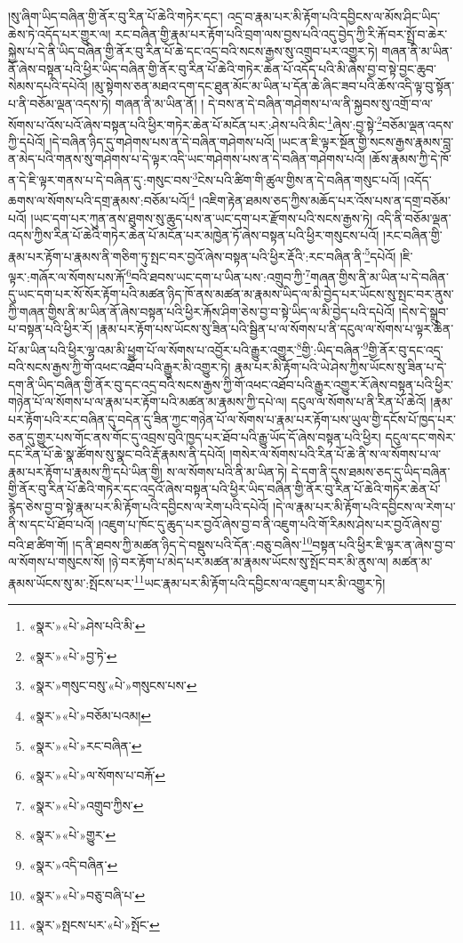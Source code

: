 །སུ་ཞིག་ཡིད་བཞིན་གྱི་ནོར་བུ་རིན་པོ་ཆེའི་གཏེར་དང་། འདྲ་བ་རྣམ་པར་མི་རྟོག་པའི་དབྱིངས་ལ་མོས་ཤིང་ཡིད་ཆེས་ཏེ་འདོད་པར་གྱུར་ལ། རང་བཞིན་གྱི་རྣམ་པར་རྟོག་པའི་བྲག་ལས་བྱས་པའི་འདུ་བྱེད་ཀྱི་རི་རྐོ་བར་སྤྲོ་བ་ཆེར་སྐྱེས་པ་དེ་ནི་ཡིད་བཞིན་གྱི་ནོར་བུ་རིན་པོ་ཆེ་དང་འདྲ་བའི་སངས་རྒྱས་སུ་འགྲུབ་པར་འགྱུར་ཏེ། གཞན་ནི་མ་ཡིན་ནོ་ཞེས་བསྟན་པའི་ཕྱིར་ཡིད་བཞིན་གྱི་ནོར་བུ་རིན་པོ་ཆེའི་གཏེར་ཆེན་པོ་འདོད་པའི་མི་ཞེས་བྱ་བ་སྟེ་བྱང་ཆུབ་སེམས་དཔའི་དཔེའོ། །མུ་སྟེགས་ཅན་མཐའ་དག་དང་ཐུན་མོང་མ་ཡིན་པ་དོན་ཆེ་ཞིང་ཟབ་པའི་ཆོས་འདི་ལྟ་བུ་སྟོན་པ་ནི་བཅོམ་ལྡན་འདས་ཏེ། གཞན་ནི་མ་ཡིན་ནོ། །
དེ་བས་ན་དེ་བཞིན་གཤེགས་པ་ལ་ནི་སྐྱབས་སུ་འགྲོ་བ་ལ་སོགས་པ་འོས་པའོ་ཞེས་བསྟན་པའི་ཕྱིར་གཏེར་ཆེན་པོ་མངོན་པར་:ཤེས་པའི་མིང་\footnote{«སྣར་»«པེ་»ཤེས་པའི་མི་}ཞེས་:བྱ་སྟེ་\footnote{«སྣར་»«པེ་»བྱ་ཏེ་}བཅོམ་ལྡན་འདས་ཀྱི་དཔེའོ། །དེ་བཞིན་ཉིད་དུ་གཤེགས་པས་ན་དེ་བཞིན་གཤེགས་པའོ། །ཡང་ན་ཇི་ལྟར་སྔོན་གྱི་སངས་རྒྱས་རྣམས་བླ་ན་མེད་པའི་གནས་སུ་གཤེགས་པ་དེ་ལྟར་འདི་ཡང་གཤེགས་པས་ན་དེ་བཞིན་གཤེགས་པའོ། །ཆོས་རྣམས་ཀྱི་དེ་ཁོ་ན་དེ་ཇི་ལྟར་གནས་པ་དེ་བཞིན་དུ་:གསུང་བས་\footnote{«སྣར་»གསུང་བསུ་«པེ་»གསུངས་པས་}ངེས་པའི་ཚིག་གི་ཚུལ་གྱིས་ན་དེ་བཞིན་གསུང་པའོ། །འདོད་ཆགས་ལ་སོགས་པའི་དགྲ་རྣམས་:བཅོམ་པའོ།\footnote{«སྣར་»«པེ་»བཅོམ་པའམ།} །འཇིག་རྟེན་ཐམས་ཅད་ཀྱིས་མཆོད་པར་འོས་པས་ན་དགྲ་བཅོམ་པའོ། །ཡང་དག་པར་ཀུན་ནས་ཐུགས་སུ་ཆུད་པས་ན་ཡང་དག་པར་རྫོགས་པའི་སངས་རྒྱས་ཏེ། འདི་ནི་བཅོམ་ལྡན་འདས་ཀྱིས་རིན་པོ་ཆེའི་གཏེར་ཆེན་པོ་མངོན་པར་མཁྱེན་ཏོ་ཞེས་བསྟན་པའི་ཕྱིར་གསུངས་པའོ། །རང་བཞིན་གྱི་རྣམ་པར་རྟོག་པ་རྣམས་ནི་གཅིག་ཏུ་སྤང་བར་བྱའོ་ཞེས་བསྟན་པའི་ཕྱིར་རྡོའི་:རང་བཞིན་ནི་\footnote{«སྣར་»«པེ་»རང་བཞིན་}དཔེའོ། །ཇི་ལྟར་:གཞོར་ལ་སོགས་པས་རྐོ་\footnote{«སྣར་»«པེ་»ལ་སོགས་པ་བརྐོ་}བའི་ཐབས་ཡང་དག་པ་ཡིན་པས་:འགྲུབ་ཀྱི་\footnote{«སྣར་»«པེ་»འགྲུབ་ཀྱིས་}གཞན་གྱིས་ནི་མ་ཡིན་པ་དེ་བཞིན་དུ་ཡང་དག་པར་སོ་སོར་རྟོག་པའི་མཚན་ཉིད་ཁོ་ནས་མཚན་མ་རྣམས་ཡིད་ལ་མི་བྱེད་པར་ཡོངས་སུ་སྤང་བར་ནུས་ཀྱི་གཞན་གྱིས་ནི་མ་ཡིན་ནོ་ཞེས་བསྟན་པའི་ཕྱིར་རྐོས་ཤིག་ཅེས་བྱ་བ་སྟེ་ཡིད་ལ་མི་བྱེད་པའི་དཔེའོ། །དེས་དེ་སྒྲུབ་པ་བསྟན་པའི་ཕྱིར་རོ། །རྣམ་པར་རྟོག་པས་ཡོངས་སུ་ཟིན་པའི་སྦྱིན་པ་ལ་སོགས་པ་ནི་དངུལ་ལ་སོགས་པ་ལྟར་ཆེན་པོ་མ་ཡིན་པའི་ཕྱིར་ལྷ་འམ་མི་ཕྱུག་པོ་ལ་སོགས་པ་འབྱོར་པའི་རྒྱུར་འགྱུར་\footnote{«སྣར་»«པེ་»གྱུར་}གྱི་:ཡིད་བཞིན་\footnote{«སྣར་»འདི་བཞིན་}གྱི་ནོར་བུ་དང་འདྲ་བའི་སངས་རྒྱས་ཀྱི་གོ་འཕང་འཐོབ་པའི་རྒྱུར་མི་འགྱུར་ཏེ། རྣམ་པར་མི་རྟོག་པའི་ཡེ་ཤེས་ཀྱིས་ཡོངས་སུ་ཟིན་པ་དེ་དག་ནི་ཡིད་བཞིན་གྱི་ནོར་བུ་དང་འདྲ་བའི་སངས་རྒྱས་ཀྱི་གོ་འཕང་འཐོབ་པའི་རྒྱུར་འགྱུར་རོ་ཞེས་བསྟན་པའི་ཕྱིར་གཉེན་པོ་ལ་སོགས་པ་ལ་རྣམ་པར་རྟོག་པའི་མཚན་མ་རྣམས་ཀྱི་དཔེ་ལ། དངུལ་ལ་སོགས་པ་ནི་རིན་པོ་ཆེའོ། །རྣམ་པར་རྟོག་པའི་རང་བཞིན་དུ་བདེན་དུ་ཟིན་ཀྱང་གཉེན་པོ་ལ་སོགས་པ་རྣམ་པར་རྟོག་པས་ཡུལ་གྱི་དངོས་པོ་ཁྱད་པར་ཅན་དུ་གྱུར་པས་གོང་ནས་གོང་དུ་འབྲས་བུའི་ཁྱད་པར་ཐོབ་པའི་རྒྱུ་ཡོད་དོ་ཞེས་བསྟན་པའི་ཕྱིར། དངུལ་དང་གསེར་དང་རིན་པོ་ཆེ་སྣ་ཚོགས་སུ་སྣང་བའི་རྡོ་རྣམས་ནི་དཔེའོ། །གསེར་ལ་སོགས་པའི་རིན་པོ་ཆེ་ནི་ས་ལ་སོགས་པ་ལ་རྣམ་པར་རྟོག་པ་རྣམས་ཀྱི་དཔེ་ཡིན་གྱི། ས་ལ་སོགས་པའི་ནི་མ་ཡིན་ཏེ། དེ་དག་ནི་དུས་ཐམས་ཅད་དུ་ཡིད་བཞིན་གྱི་ནོར་བུ་རིན་པོ་ཆེའི་གཏེར་དང་འདྲའོ་ཞེས་བསྟན་པའི་ཕྱིར་ཡིད་བཞིན་གྱི་ནོར་བུ་རིན་པོ་ཆེའི་གཏེར་ཆེན་པོ་རྙེད་ཅེས་བྱ་བ་སྟེ་རྣམ་པར་མི་རྟོག་པའི་དབྱིངས་ལ་རེག་པའི་དཔེའོ། །དེ་ལ་རྣམ་པར་མི་རྟོག་པའི་དབྱིངས་ལ་རེག་པ་ནི་ས་དང་པོ་ཐོབ་པའོ། །འཇུག་པ་ཁོང་དུ་ཆུད་པར་བྱའོ་ཞེས་བྱ་བ་ནི་འཇུག་པའི་གོ་རིམས་ཤེས་པར་བྱའོ་ཞེས་བྱ་བའི་ཐ་ཚིག་གོ། །ད་ནི་ཐབས་ཀྱི་མཚན་ཉིད་དེ་བསྡུས་པའི་དོན་:བཅུ་བཞིས་\footnote{«སྣར་»«པེ་»བཅུ་བཞི་པ་}བསྟན་པའི་ཕྱིར་ཇི་ལྟར་ན་ཞེས་བྱ་བ་ལ་སོགས་པ་གསུངས་སོ། །ཉེ་བར་རྟོག་པ་མེད་པར་མཚན་མ་རྣམས་ཡོངས་སུ་སྤོང་བར་མི་ནུས་ལ། མཚན་མ་རྣམས་ཡོངས་སུ་མ་:སྤོངས་པར་\footnote{«སྣར་»སྤངས་པར་«པེ་»སྤོང་}ཡང་རྣམ་པར་མི་རྟོག་པའི་དབྱིངས་ལ་འཇུག་པར་མི་འགྱུར་ཏེ། 